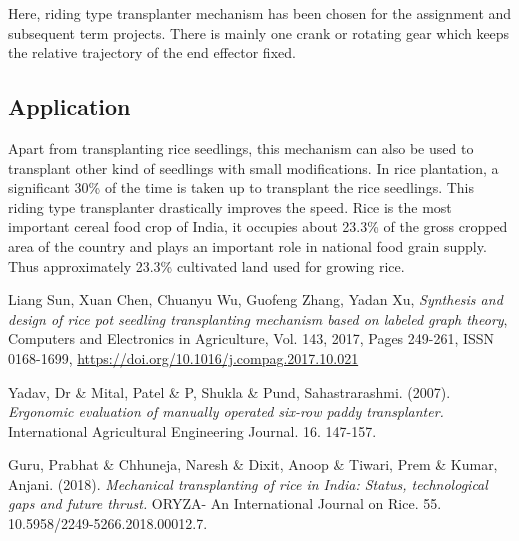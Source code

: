 \documentclass[a4paper,latin,center,onecolumn]{paper}
\begin{document}
            Here, riding type transplanter mechanism has been chosen for the assignment and subsequent term projects. There is mainly one crank or rotating gear which keeps the relative trajectory of the end effector fixed.

        \subsection{Application}
            Apart from transplanting rice seedlings, this mechanism can also be used to transplant other kind of seedlings with small modifications. In rice plantation, a significant 30\% of the time is taken up to transplant the rice seedlings. This riding type transplanter drastically improves the speed. Rice is the most important cereal food crop of India, it occupies about 23.3\% of the gross cropped area of the country and plays an important role in national food grain supply. Thus approximately 23.3\% cultivated land used for growing rice.
        

    \begin{thebibliography}{999}

            Liang Sun, Xuan Chen, Chuanyu Wu, Guofeng Zhang, Yadan Xu, 
            \emph{Synthesis and design of rice pot seedling transplanting mechanism based on labeled graph theory},
            Computers and Electronics in Agriculture,
            Vol. 143,
            2017,
            Pages 249-261,
            ISSN 0168-1699,
            \href{https://doi.org/10.1016/j.compag.2017.10.021}{https://doi.org/10.1016/j.compag.2017.10.021}
            
            Yadav, Dr \& Mital, Patel \& P, Shukla \& Pund, Sahastrarashmi. (2007). \emph{Ergonomic evaluation of manually operated six-row paddy transplanter.} International Agricultural Engineering Journal. 16. 147-157. 
        
            Guru, Prabhat \& Chhuneja, Naresh \& Dixit, Anoop \& Tiwari, Prem \& Kumar, Anjani. (2018). \emph{Mechanical transplanting of rice in India: Status, technological gaps and future thrust.} ORYZA- An International Journal on Rice. 55. 10.5958/2249-5266.2018.00012.7. 
        
    \end{thebibliography}
\end{document}
